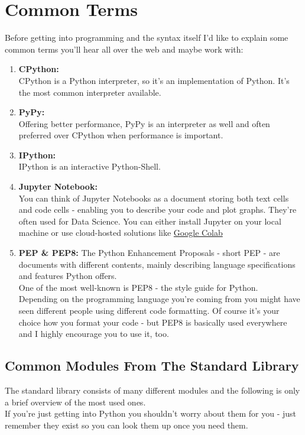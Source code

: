 \section{Common Terms}
    Before getting into programming and the syntax itself I'd like to explain some common terms you'll hear all over the web and maybe work with:
    \begin{enumerate}
        \item \textbf{CPython:}\\
            CPython is a Python interpreter, so it's an implementation of Python.
            It's the most common interpreter available.
        \item \textbf{PyPy:}\\
            Offering better performance, PyPy is an interpreter as well and often preferred over CPython when performance is important.
        \item \textbf{IPython:}\\
            IPython is an interactive Python-Shell.
        \item \textbf{Jupyter Notebook:}\\
            You can think of Jupyter Notebooks as a document storing both text cells and code cells - enabling you to describe your code and plot graphs. They're often used for Data Science.
            You can either install Jupyter on your local machine or use cloud-hosted solutions like \href{https://colab.research.google.com/}{Google Colab}
        \item \textbf{PEP \& PEP8:}
            The Python Enhancement Proposals - short PEP - are documents with different contents, mainly describing language specifications and features Python offers.\\
            One of the most well-known is PEP8 - the style guide for Python.\\
            Depending on the programming language you're coming from you might have seen different people using different code formatting.
            Of course it's your choice how you format your code - but PEP8 is basically used everywhere and I highly encourage you to use it, too.
        \end{enumerate}
        
    \subsection{Common Modules From The Standard Library}
        The standard library consists of many different modules and the following is only a brief overview of the most used ones.\\
        If you're just getting into Python you shouldn't worry about them for you - just remember they exist so you can look them up once you need them.
        
